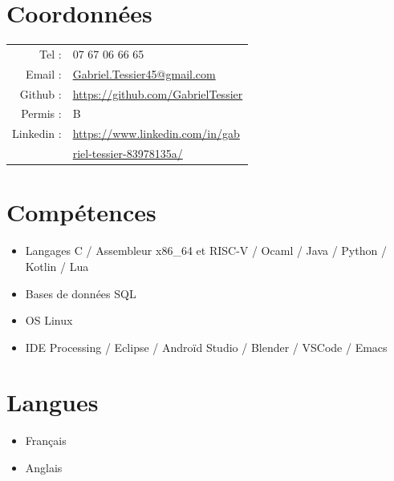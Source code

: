 \documentclass[11pt,oneside,a4paper,titlepage]{article}
\begin{document}
\begin{tcolorbox}
  \begin{minipage}[t]{8cm}
    \vspace*{-0.5cm}
    \begin{tcolorbox}[grow to left by=0.6cm,colback=gray!25,colframe=white]
      \section*{Coordonnées}
      \setlength{\tabcolsep}{2pt}
      \begin{tabular}{rl}
        Tel : & 07 67 06 66 65 \\
        Email : & \href{mailto:Gabriel.Tessier45@gmail.com}{Gabriel.Tessier45@gmail.com} \\
        Github : & \href{https://github.com/GabrielTessier}{https://github.com/GabrielTessier} \\
        Permis : & B\\
        Linkedin : & \href{https://www.linkedin.com/in/gabriel-tessier-83978135a/}{https://www.linkedin.com/in/gab}\\
        & \href{https://www.linkedin.com/in/gabriel-tessier-83978135a/}{riel-tessier-83978135a/}
      \end{tabular}

      \section*{Compétences}
      \begin{itemize}
        \item{Langages C / Assembleur x86\_64 et RISC-V / Ocaml / Java / Python / Kotlin / Lua}
        \item{Bases de données SQL}
        \item{OS Linux}
        \item{IDE Processing / Eclipse / Androïd Studio / Blender / VSCode / Emacs}
      \end{itemize}

      \section*{Langues}
      \begin{itemize}
        \item{Français}
        \item{Anglais}
      \end{itemize}


\end{tcolorbox}
\end{minipage}
\end{tcolorbox}
\end{document}
